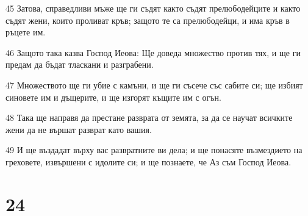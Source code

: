 \par 45 Затова, справедливи мъже ще ги съдят както съдят прелюбодейците и както съдят жени, които проливат кръв; защото те са прелюбодейци, и има кръв в ръцете им.
\par 46 Защото така казва Господ Иеова: Ще доведа множество против тях, и ще ги предам да бъдат тласкани и разграбени.
\par 47 Множеството ще ги убие с камъни, и ще ги съсече със сабите си; ще избият синовете им и дъщерите, и ще изгорят къщите им с огън.
\par 48 Така ще направя да престане разврата от земята, за да се научат всичките жени да не вършат разврат като вашия.
\par 49 И ще въздадат върху вас развратните ви дела; и ще понасяте възмездието на греховете, извършени с идолите си; и ще познаете, че Аз съм Господ Иеова.

\chapter{24}

